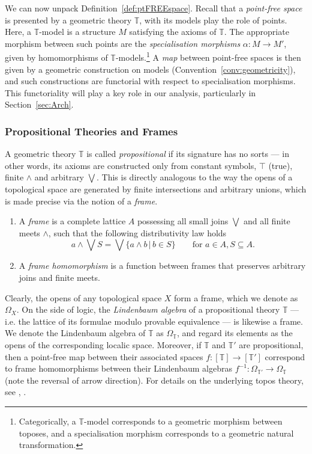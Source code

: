 \documentclass[a4paper, 11pt,reqno]{amsart}
\newcommand{\thT}{\mathbb{T}}
\begin{document}
We can now unpack Definition~\ref{def:ptFREEspace}. Recall that a {\em point-free space} is presented by a geometric theory $\thT$, with its models play the role of points. Here, a $\thT$-model is
a structure $M$ satisfying the axioms of $\thT$. The appropriate morphism between such points are the {\em specialisation morphisms} $\alpha\colon M\to M'$, given by homomorphisms of $\thT$-models.\footnote{Categorically, a $\thT$-model corresponds to a geometric
	morphism between toposes, and a specialisation morphism corresponds to a
	geometric natural transformation.} A {\em map} between point-free spaces is then given by a geometric construction on models (Convention~\ref{conv:geometricity}), and such constructions are functorial with
respect to specialisation morphisms. This functoriality will play a key
role in our analysis, particularly in Section~\ref{sec:Arch}.

\subsubsection{Propositional Theories and Frames}\label{subsec:prop-th-frame} A geometric theory $\thT$ is called {\em propositional} if its signature has no sorts --- in other words, its axioms are constructed only from constant symbols, $\top$ (true), finite $\land$ and arbitrary $\bigvee$. This is directly analogous to the way the opens of a topological space are generated by finite intersections and arbitrary unions, which is made precise via the notion of a {\em frame}.

	\begin{definition}[Frame]\label{def:frame} \hfill
	\begin{enumerate}[label=(\roman*)]
		\item 	A \emph{frame} is a complete lattice $A$ possessing all small joins $\bigvee$ and all finite meets $\land$, such that the following distributivity law holds
		\[a\land \bigvee S = \bigvee \{a\land b \,|\, b\in S\} \qquad \text{for}\,\,  a\in A, S\subseteq A.\]
		\item 	A \emph{frame homomorphism} is a function between frames that preserves arbitrary joins and finite meets.
	\end{enumerate}	
\end{definition}

Clearly, the opens of any topological space $X$ form a frame, which we denote as $\Omega_X$. On the side of logic, the {\em Lindenbaum algebra} of a propositional theory $\thT$ --- i.e. the lattice of its formulae modulo provable equivalence --- is likewise a frame. We denote the Lindenbaum algebra of $\thT$ as $\Omega_\thT$, and regard its elements as the opens of the corresponding localic space. Moreover, if $\thT$ and $\thT'$ are propositional, then a point-free map between their associated spaces 
$f\colon [\thT]\to[\thT']$ correspond to frame homomorphisms between their Lindenbaum algebras $f^{-1}\colon \Omega_{\thT'}\to \Omega_{\thT}$ (note the reversal of arrow direction). For details on the underlying topos theory, see \cite[\S 2.2]{Vi07}, \cite[C1.3-4]{Elephant}.
\end{document}

